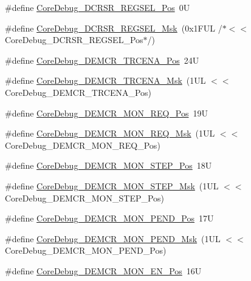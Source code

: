 \begin{DoxyCompactItemize}
\#define \hyperlink{group___c_m_s_i_s___core_debug_ga52182c8a9f63a52470244c0bc2064f7b}{Core\-Debug\-\_\-\-D\-C\-R\-S\-R\-\_\-\-R\-E\-G\-S\-E\-L\-\_\-\-Pos}~0\-U
\item 
\#define \hyperlink{group___c_m_s_i_s___core_debug_ga17cafbd72b55030219ce5609baa7c01d}{Core\-Debug\-\_\-\-D\-C\-R\-S\-R\-\_\-\-R\-E\-G\-S\-E\-L\-\_\-\-Msk}~(0x1\-F\-U\-L /$\ast$$<$$<$ Core\-Debug\-\_\-\-D\-C\-R\-S\-R\-\_\-\-R\-E\-G\-S\-E\-L\-\_\-\-Pos$\ast$/)
\item 
\#define \hyperlink{group___c_m_s_i_s___core_debug_ga6ff2102b98f86540224819a1b767ba39}{Core\-Debug\-\_\-\-D\-E\-M\-C\-R\-\_\-\-T\-R\-C\-E\-N\-A\-\_\-\-Pos}~24\-U
\item 
\#define \hyperlink{group___c_m_s_i_s___core_debug_ga5e99652c1df93b441257389f49407834}{Core\-Debug\-\_\-\-D\-E\-M\-C\-R\-\_\-\-T\-R\-C\-E\-N\-A\-\_\-\-Msk}~(1\-U\-L $<$$<$ Core\-Debug\-\_\-\-D\-E\-M\-C\-R\-\_\-\-T\-R\-C\-E\-N\-A\-\_\-\-Pos)
\item 
\#define \hyperlink{group___c_m_s_i_s___core_debug_ga341020a3b7450416d72544eaf8e57a64}{Core\-Debug\-\_\-\-D\-E\-M\-C\-R\-\_\-\-M\-O\-N\-\_\-\-R\-E\-Q\-\_\-\-Pos}~19\-U
\item 
\#define \hyperlink{group___c_m_s_i_s___core_debug_gae6384cbe8045051186d13ef9cdeace95}{Core\-Debug\-\_\-\-D\-E\-M\-C\-R\-\_\-\-M\-O\-N\-\_\-\-R\-E\-Q\-\_\-\-Msk}~(1\-U\-L $<$$<$ Core\-Debug\-\_\-\-D\-E\-M\-C\-R\-\_\-\-M\-O\-N\-\_\-\-R\-E\-Q\-\_\-\-Pos)
\item 
\#define \hyperlink{group___c_m_s_i_s___core_debug_ga9ae10710684e14a1a534e785ef390e1b}{Core\-Debug\-\_\-\-D\-E\-M\-C\-R\-\_\-\-M\-O\-N\-\_\-\-S\-T\-E\-P\-\_\-\-Pos}~18\-U
\item 
\#define \hyperlink{group___c_m_s_i_s___core_debug_ga2ded814556de96fc369de7ae9a7ceb98}{Core\-Debug\-\_\-\-D\-E\-M\-C\-R\-\_\-\-M\-O\-N\-\_\-\-S\-T\-E\-P\-\_\-\-Msk}~(1\-U\-L $<$$<$ Core\-Debug\-\_\-\-D\-E\-M\-C\-R\-\_\-\-M\-O\-N\-\_\-\-S\-T\-E\-P\-\_\-\-Pos)
\item 
\#define \hyperlink{group___c_m_s_i_s___core_debug_ga1e2f706a59e0d8131279af1c7e152f8d}{Core\-Debug\-\_\-\-D\-E\-M\-C\-R\-\_\-\-M\-O\-N\-\_\-\-P\-E\-N\-D\-\_\-\-Pos}~17\-U
\item 
\#define \hyperlink{group___c_m_s_i_s___core_debug_ga68ec55930269fab78e733dcfa32392f8}{Core\-Debug\-\_\-\-D\-E\-M\-C\-R\-\_\-\-M\-O\-N\-\_\-\-P\-E\-N\-D\-\_\-\-Msk}~(1\-U\-L $<$$<$ Core\-Debug\-\_\-\-D\-E\-M\-C\-R\-\_\-\-M\-O\-N\-\_\-\-P\-E\-N\-D\-\_\-\-Pos)
\item 
\#define \hyperlink{group___c_m_s_i_s___core_debug_ga802829678f6871863ae9ecf60a10425c}{Core\-Debug\-\_\-\-D\-E\-M\-C\-R\-\_\-\-M\-O\-N\-\_\-\-E\-N\-\_\-\-Pos}~16\-U

\end{DoxyCompactItemize}

